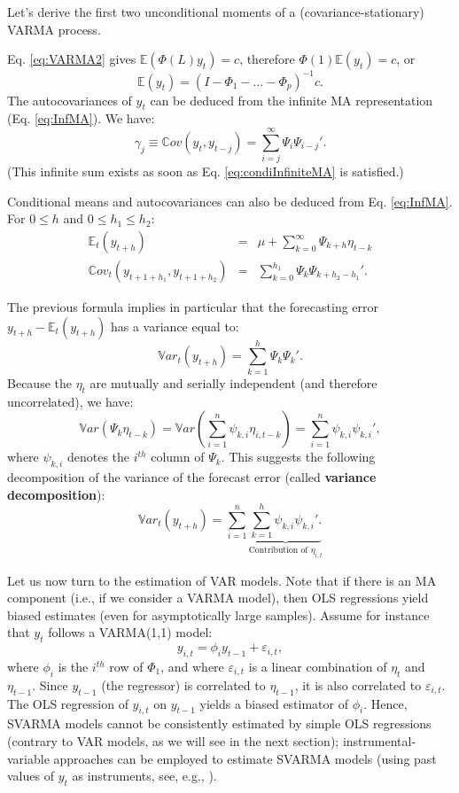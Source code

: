 \documentclass[
  12pt,
]{book}
\theoremstyle{definition}
\theoremstyle{definition}
\theoremstyle{definition}
\theoremstyle{definition}
\theoremstyle{remark}
\begin{document}
Let's derive the first two unconditional moments of a (covariance-stationary) VARMA process.

Eq. \eqref{eq:VARMA2} gives \(\mathbb{E}(\Phi(L)y_t)=c\), therefore \(\Phi(1)\mathbb{E}(y_t)=c\), or
\[
\mathbb{E}(y_t) = (I - \Phi_1 - \dots - \Phi_p)^{-1}c.
\]
The autocovariances of \(y_t\) can be deduced from the infinite MA representation (Eq. \eqref{eq:InfMA}). We have:
\[
\gamma_j \equiv \mathbb{C}ov(y_t,y_{t-j}) = \sum_{i=j}^\infty \Psi_i \Psi_{i-j}'.
\]
(This infinite sum exists as soon as Eq. \eqref{eq:condiInfiniteMA} is satisfied.)

Conditional means and autocovariances can also be deduced from Eq. \eqref{eq:InfMA}. For \(0 \le h\) and \(0 \le h_1 \le h_2\):
\begin{eqnarray*}
\mathbb{E}_t(y_{t+h}) &=& \mu + \sum_{k=0}^\infty \Psi_{k+h} \eta_{t-k} \\
\mathbb{C}ov_t(y_{t+1+h_1},y_{t+1+h_2}) &=& \sum_{k=0}^{h_1} \Psi_{k}\Psi_{k+h_2-h_1}'.
\end{eqnarray*}

The previous formula implies in particular that the forecasting error \(y_{t+h} - \mathbb{E}_t(y_{t+h})\) has a variance equal to:
\[
\mathbb{V}ar_t(y_{t+h}) = \sum_{k=1}^{h} \Psi_{k}\Psi_{k}'.
\]
Because the \(\eta_t\) are mutually and serially independent (and therefore uncorrelated), we have:
\[
\mathbb{V}ar(\Psi_k \eta_{t-k}) = \mathbb{V}ar\left(\sum_{i=1}^n \psi_{k,i} \eta_{i,t-k}\right)  = \sum_{i=1}^n \psi_{k,i}\psi_{k,i}',
\]
where \(\psi_{k,i}\) denotes the \(i^{th}\) column of \(\Psi_k\). This suggests the following decomposition of the variance of the forecast error (called \textbf{variance decomposition}):
\[
\mathbb{V}ar_t(y_{t+h}) = \sum_{i=1}^n \underbrace{\sum_{k=1}^{h}  \psi_{k,i}\psi_{k,i}'.}_{\mbox{Contribution of $\eta_{i,t}$}}
\]

Let us now turn to the estimation of VAR models. Note that if there is an MA component (i.e., if we consider a VARMA model), then OLS regressions yield biased estimates (even for asymptotically large samples). Assume for instance that \(y_t\) follows a VARMA(1,1) model:
\[
y_{i,t} = \phi_i y_{t-1} + \varepsilon_{i,t},
\]
where \(\phi_i\) is the \(i^{th}\) row of \(\Phi_1\), and where \(\varepsilon_{i,t}\) is a linear combination of \(\eta_t\) and \(\eta_{t-1}\). Since \(y_{t-1}\) (the regressor) is correlated to \(\eta_{t-1}\), it is also correlated to \(\varepsilon_{i,t}\). The OLS regression of \(y_{i,t}\) on \(y_{t-1}\) yields a biased estimator of \(\phi_i\). Hence, SVARMA models cannot be consistently estimated by simple OLS regressions (contrary to VAR models, as we will see in the next section); instrumental-variable approaches can be employed to estimate SVARMA models (using past values of \(y_t\) as instruments, see, e.g., \citet{Gourieroux_Monfort_Renne_2020}).
\end{document}
